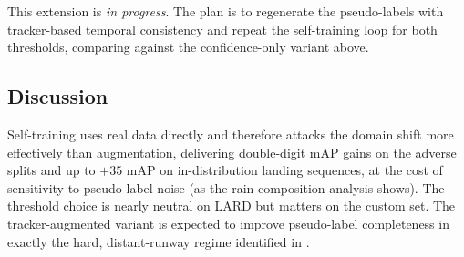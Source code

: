 This extension is \emph{in progress}. The plan is to regenerate the pseudo-labels with
tracker-based temporal consistency and repeat the self-training loop for both
thresholds, comparing against the confidence-only variant above.

\subsection{Discussion}
\label{subsec:pl-discussion}
Self-training uses real data directly and therefore attacks the domain shift more
effectively than augmentation, delivering double-digit mAP gains on the adverse
splits and up to $+35$ mAP on in-distribution landing sequences, at the cost of
sensitivity to pseudo-label noise (as the rain-composition analysis shows). The
threshold choice is nearly neutral on LARD but matters on the custom set. The
tracker-augmented variant is expected to improve pseudo-label completeness in exactly
the hard, distant-runway regime identified in .
